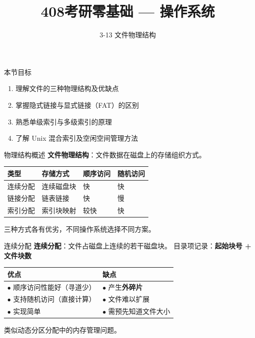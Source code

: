 \documentclass[10pt, aspectratio=169]{beamer}
\title{408考研零基础 --- 操作系统}
\subtitle{3-13 文件物理结构}
\author{}
\date{}
\begin{document}
\begin{frame}{本节目标}
    \begin{enumerate}
        \item 理解文件的三种物理结构及优缺点
        \item 掌握隐式链接与显式链接（FAT）的区别
        \item 熟悉单级索引与多级索引的原理
        \item 了解 Unix 混合索引及空闲空间管理方法
    \end{enumerate}
\end{frame}

\begin{frame}{物理结构概述}
    \textbf{文件物理结构}：文件数据在磁盘上的存储组织方式。
    \vspace{0.5em}
    \begin{center}
        \begin{tabular}{|l|l|l|l|}
            \hline
            \textbf{类型} & \textbf{存储方式} & \textbf{顺序访问} & \textbf{随机访问} \\
            \hline
            连续分配 & 连续磁盘块 & 快 & 快 \\
            链接分配 & 链表链接 & 快 & 慢 \\
            索引分配 & 索引块映射 & 较快 & 快 \\
            \hline
        \end{tabular}
    \end{center}
    \vspace{0.5em}
    三种方式各有优劣，不同操作系统选择不同方案。
\end{frame}

\begin{frame}{连续分配}
    \textbf{连续分配}：文件占磁盘上连续的若干磁盘块。
    \vspace{0.5em}
    目录项记录：\textbf{起始块号 + 文件块数}
    \vspace{0.5em}
    \begin{center}
        \begin{tabular}{|l|l|}
            \hline
            \textbf{优点} & \textbf{缺点} \\
            \hline
            $\bullet$ 顺序访问性能好（寻道少） & $\bullet$ 产生\textbf{外碎片} \\
            $\bullet$ 支持随机访问（直接计算） & $\bullet$ 文件难以扩展 \\
            $\bullet$ 实现简单 & $\bullet$ 需预先知道文件大小 \\
            \hline
        \end{tabular}
    \end{center}
    \vspace{0.5em}
    类似动态分区分配中的内存管理问题。
\end{frame}
\end{document}
